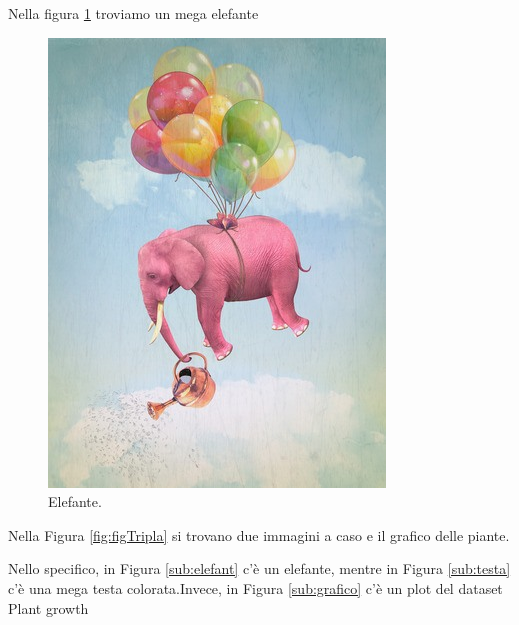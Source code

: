 \documentclass[
]{article}
\begin{document}
Nella figura \ref{fig:elef} troviamo un mega elefante

\begin{figure}
\centering
\caption{Elefante.}
\label{fig:elef}

\includegraphics[width=0.5\linewidth]{image/elefante} 

\end{figure}

Nella Figura \ref{fig:figTripla} si trovano due immagini a caso e il
grafico delle piante.

Nello specifico, in Figura \ref{sub:elefant} c'è un elefante, mentre in
Figura \ref{sub:testa} c'è una mega testa colorata.Invece, in Figura
\ref{sub:grafico} c'è un plot del dataset Plant growth
\end{document}
